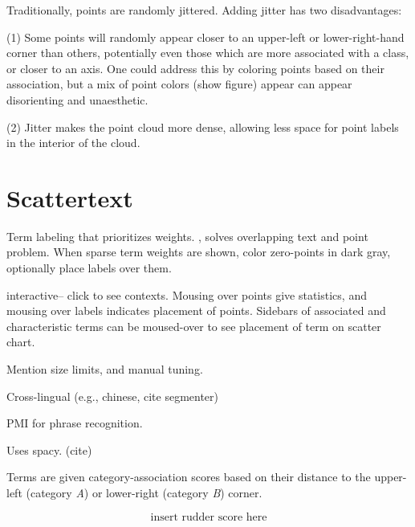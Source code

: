 \documentclass[11pt]{article}
\begin{document}
Traditionally, points are randomly jittered.  Adding jitter has two disadvantages: 

(1) Some points will randomly appear closer to an upper-left or lower-right-hand corner than others, potentially even those which are more associated with a class, or closer to an axis.  One could address this by coloring points based on their association, but a mix of point colors (show figure) appear can appear disorienting and unaesthetic. 

(2) Jitter makes the point cloud more dense, allowing less space for point labels in the interior of the cloud.  

\section{Scattertext}
\label{scattertext}

Term labeling that prioritizes weights. \cite{cozy}, solves overlapping text and point problem.  When sparse term weights are shown, color zero-points in dark gray, optionally place labels over them.  

interactive-- click to see contexts.  Mousing over points give statistics, and mousing over labels indicates placement of points.  Sidebars of associated and characteristic terms can be moused-over to see placement of term on scatter chart.

Mention size limits, and manual tuning.  

Cross-lingual (e.g., chinese, cite segmenter)

PMI for phrase recognition.

Uses spacy. (cite)

Terms are given category-association scores based on their distance to the upper-left (category \textit{A}) or lower-right (category \textit{B}) corner.

\begin{equation}
  \mbox{insert rudder score here}
  \label{eqn:cornerscore}
\end{equation}
\end{document}

